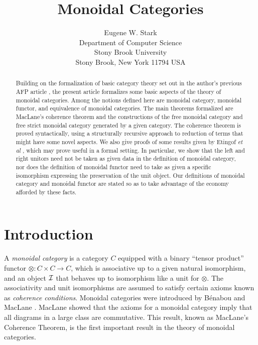 \documentclass[11pt,notitlepage,a4paper]{report}
\begin{document}
\title{Monoidal Categories}
\author{Eugene W. Stark\\[\medskipamount]
        Department of Computer Science\\
        Stony Brook University\\
        Stony Brook, New York 11794 USA}
\maketitle

\begin{abstract}
Building on the formalization of basic category theory set out in the author's
previous AFP article \cite{Category3-AFP}, the present article formalizes
some basic aspects of the theory of monoidal categories.
Among the notions defined here are monoidal category, monoidal functor,
and equivalence of monoidal categories.
The main theorems formalized are MacLane's coherence theorem and the
constructions of the free monoidal category and free strict monoidal category
generated by a given category.
The coherence theorem is proved syntactically, using a structurally recursive
approach to reduction of terms that might have some novel aspects.
We also give proofs of some results given by Etingof {\em et al}
\cite{Etingof15}, which may prove useful in a formal setting.
In particular, we show that the left and right unitors need not be taken as
given data in the definition of monoidal category, nor does the definition of
monoidal functor need to take as given a specific isomorphism expressing the
preservation of the unit object.
Our definitions of monoidal category and monoidal functor are stated so as
to take advantage of the economy afforded by these facts.
\end{abstract}

\tableofcontents

\chapter{Introduction}

A {\em monoidal category} is a category $C$ equipped with a
binary ``tensor product'' functor $\otimes: C \times C \rightarrow C$,
which is associative up to a given natural isomorphism,
and an object ${\cal I}$ that behaves up to isomorphism like
a unit for $\otimes$.  The associativity and unit isomorphisms are
assumed to satisfy certain axioms known as {\em coherence conditions}.
Monoidal categories were introduced by B\'{e}nabou \cite{Benabou63} and
MacLane \cite{MacLane63}.  MacLane showed that the axioms for a monoidal
category imply that all diagrams in a large class are commutative.
This result, known as MacLane's Coherence Theorem, is the first important
result in the theory of monoidal categories.
\end{document}
